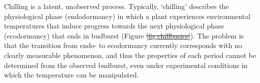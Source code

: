 \documentclass[11pt]{article}
\providecommand{\DIFadd}[1]{{\protect\color{blue}\uwave{#1}}} %
\providecommand{\DIFdel}[1]{{\protect\color{red}\sout{#1}}}                      %
\providecommand{\DIFaddbegin}{} %
\providecommand{\DIFaddend}{} %
\providecommand{\DIFdelbegin}{} %
\providecommand{\DIFdelend}{} %
\newcommand{\DIFscaledelfig}{0.5}
\newlength{\DIFdelgraphicswidth} %
\newlength{\DIFdelgraphicsheight} %
\newcommand{\DIFaddincludegraphics}[2][]{{\color{blue}\fbox{\DIFOincludegraphics[#1]{#2}}}} %
\newcommand{\DIFdelincludegraphics}[2][]{%
\sbox{\DIFdelgraphicsbox}{\DIFOincludegraphics[#1]{#2}}%
\settoboxwidth{\DIFdelgraphicswidth}{\DIFdelgraphicsbox} %
\settoboxtotalheight{\DIFdelgraphicsheight}{\DIFdelgraphicsbox} %
\scalebox{\DIFscaledelfig}{%
\parbox[b]{\DIFdelgraphicswidth}{\usebox{\DIFdelgraphicsbox}\\[-\baselineskip] \rule{\DIFdelgraphicswidth}{0em}}\llap{\resizebox{\DIFdelgraphicswidth}{\DIFdelgraphicsheight}{%
\setlength{\unitlength}{\DIFdelgraphicswidth}%
\begin{picture}(1,1)%
\thicklines\linethickness{2pt} %
{\color[rgb]{1,0,0}\put(0,0){\framebox(1,1){}}}%
{\color[rgb]{1,0,0}\put(0,0){\line( 1,1){1}}}%
{\color[rgb]{1,0,0}\put(0,1){\line(1,-1){1}}}%
\end{picture}%
}\hspace*{3pt}}} %
} %
\DeclareRobustCommand{\DIFaddbegin}{\DIFOaddbegin \let\includegraphics\DIFaddincludegraphics} %
\DeclareRobustCommand{\DIFaddend}{\DIFOaddend \let\includegraphics\DIFOincludegraphics} %
\DeclareRobustCommand{\DIFdelbegin}{\DIFOdelbegin \let\includegraphics\DIFdelincludegraphics} %
\DeclareRobustCommand{\DIFdelend}{\DIFOaddend \let\includegraphics\DIFOincludegraphics} %
\begin{document}
Chilling is a latent, unobserved process. Typically, %
%
`chilling' describes the physiological phase (endodormancy) in which a plant experiences environmental temperatures that induce progress towards the next physiological phase (ecodormancy) that ends in budburst (Figure \DIFdelbegin \DIFdel{\ref{fig:chillbasics}}\DIFdelend \DIFaddbegin \DIFadd{\ref{fig:modelsketch}}\DIFaddend ). The problem is that the transition from endo- to ecodormancy currently corresponds with no clearly measurable phenomenon, and thus the properties of each period cannot be determined from the observed budburst, even under experimental conditions in which the temperature can be manipulated. 
\end{document}
